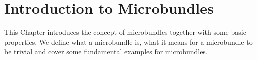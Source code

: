 \chapter{Introduction to Microbundles}\label{chapter::microbundle}
\begin{myparagraph}
    This Chapter introduces the concept of microbundles
    together with some basic properties.
    We define what a microbundle is, what it means for a microbundle to be trivial and 
    cover some fundamental examples for microbundles.
\end{myparagraph}





